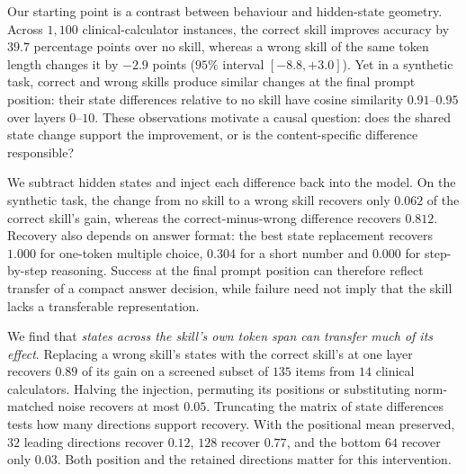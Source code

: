 \documentclass{article}
\begin{document}
Our starting point is a contrast between behaviour and hidden-state geometry.
Across $1{,}100$ clinical-calculator instances, the correct skill improves
accuracy by $39.7$ percentage points over no skill, whereas a wrong skill of
the same token length changes it by $-2.9$ points ($95\%$ interval
$[-8.8,+3.0]$). Yet in a synthetic task, correct and wrong skills produce
similar changes at the final prompt position: their state differences relative
to no skill have cosine similarity $0.91$--$0.95$ over layers $0$--$10$.
These observations motivate a causal question: does the shared state change
support the improvement, or is the content-specific difference responsible?

We subtract hidden states and inject each difference back into the model. On
the synthetic task, the change from no skill to a wrong skill recovers only
$0.062$ of the correct skill's gain, whereas the correct-minus-wrong difference
recovers $0.812$. Recovery also depends on answer format: the best state
replacement recovers $1.000$ for one-token multiple choice, $0.304$ for a short
number and $0.000$ for step-by-step reasoning. Success at the final prompt
position can therefore reflect transfer of a compact answer decision, while
failure need not imply that the skill lacks a transferable representation.

We find that \emph{states across the skill's own token span can transfer much
of its effect}. Replacing a wrong skill's states with the correct skill's at
one layer recovers $0.89$ of its gain on a screened subset of $135$ items from
$14$ clinical calculators. Halving the injection, permuting its positions or
substituting norm-matched noise recovers at most $0.05$. Truncating the matrix
of state differences tests how many directions support recovery. With the
positional mean preserved, $32$ leading directions recover $0.12$, $128$
recover $0.77$, and the bottom $64$ recover only $0.03$. Both position and the
retained directions matter for this intervention.
\end{document}
